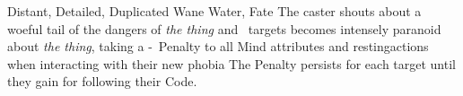   {Distant, Detailed, Duplicated}%
  {Wane}%
  {Water, Fate}%
  {}%
  {The caster shouts about a woeful tail of the dangers of \emph{the thing} and ~targets becomes intensely paranoid about \emph{the thing}, taking a -~Penalty to all Mind \glspl{attribute}  and \glspl{restingaction} when interacting with their new phobia}%
  {
  The Penalty persists for each target until they gain  for following their Code.}

